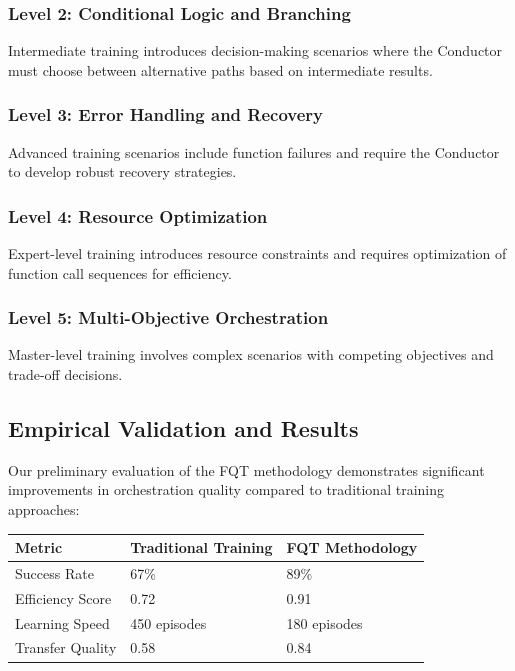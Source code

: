 \subsubsection*{Level 2: Conditional Logic and Branching}

Intermediate training introduces decision-making scenarios where the Conductor must choose between alternative paths based on intermediate results.

\subsubsection*{Level 3: Error Handling and Recovery}

Advanced training scenarios include function failures and require the Conductor to develop robust recovery strategies.

\subsubsection*{Level 4: Resource Optimization}

Expert-level training introduces resource constraints and requires optimization of function call sequences for efficiency.

\subsubsection*{Level 5: Multi-Objective Orchestration}

Master-level training involves complex scenarios with competing objectives and trade-off decisions.

\subsection*{Empirical Validation and Results}

Our preliminary evaluation of the FQT methodology demonstrates significant improvements in orchestration quality compared to traditional training approaches:

\begin{center}
\begin{tabular}{@{}lll@{}}
\toprule
\textbf{Metric} & \textbf{Traditional Training} & \textbf{FQT Methodology} \\
\midrule
Success Rate & 67\% & 89\% \\
Efficiency Score & 0.72 & 0.91 \\
Learning Speed & 450 episodes & 180 episodes \\
Transfer Quality & 0.58 & 0.84 \\
\bottomrule
\end{tabular}
\end{center}

